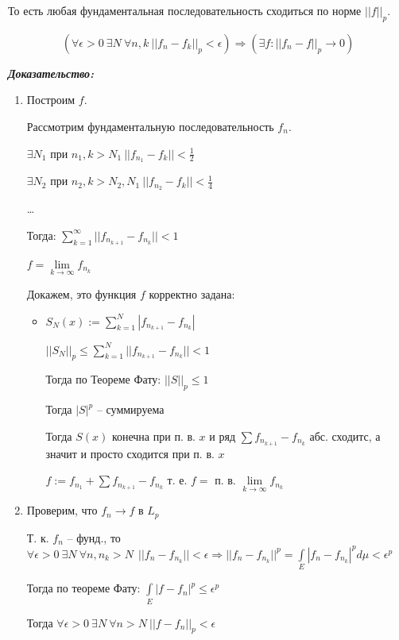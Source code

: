 \documentclass[paper=a4, fontsize=17pt]{article}
\begin{document}
То есть любая фундаментальная последовательность сходиться по норме $ ||f||_p $.

$$(\forall \epsilon > 0 ~ \exists N ~ \forall n, k ~ ||f_n - f_k||_p < \epsilon) \Rightarrow (\exists f : ||f_n - f||_p \rightarrow 0)$$


\textbf{\emph{Доказательство:}}

\begin{enumerate}
	\item Построим $ f $.

	Рассмотрим фундаментальную последовательность $ f_n $.

	$ \exists N_1 $ при $ n_1, k > N_1 ~ ||f_{n_1} - f_k|| < \frac{1}{2}$

	$ \exists N_2 $ при $ n_2, k > N_2, N_1 ~ ||f_{n_2} - f_k|| < \frac{1}{4}$

	\dots

	Тогда: $ \sum_{k = 1}^{\infty} || f_{n_{k+1}} - f_{n_k} || < 1$

	$ f = \lim\limits_{k \rightarrow \infty} f_{n_k}$

	Докажем, это функция $ f $ корректно задана:
	\begin{itemize}
		\item
		$ S_N (x) := \sum_{k = 1}^{N}|f_{n_{k+1}} - f_{n_k}|$

		$ ||S_N||_p \leq \sum_{k = 1}^{N} || f_{n_{k+1}} - f_{n_k} || < 1$

		Тогда по Теореме Фату: $ ||S||_p \leq 1 $

		Тогда $ |S|^p $ -- суммируема

		Тогда $ S(x) $ конечна при п. в. $ x $  и ряд $ \sum f_{n_{k + 1}} - f_{n_k} $ абс. сходитс, а значит и просто сходится при п. в. $ x $

		$ f:= f_{n_1} +  \sum f_{n_{k + 1}} - f_{n_k} $ т. е. $ f = $ п. в. $ \lim\limits_{k \rightarrow \infty} f_{n_k} $
	\end{itemize}

	\item Проверим, что $ f_n \rightarrow f $ в $ L_p $

	Т. к. $ f_n $ -- фунд., то $ \forall \epsilon > 0 ~ \exists N ~ \forall n, n_k > N ~ ~ ||f_n - f_{n_k} || < \epsilon \Rightarrow
	|| f_n  - f_{n_k} ||^p  = \int\limits_{E} |f_n  - f_{n_k}|^p d\mu < \epsilon^p $

	Тогда по теореме Фату: $ \int\limits_{E} |f - f_n|^p \leq \epsilon^p$

	Тогда $ \forall \epsilon > 0 ~ \exists N ~ \forall n > N ~ || f - f_n ||_p < \epsilon $


\end{enumerate}
\end{document}
